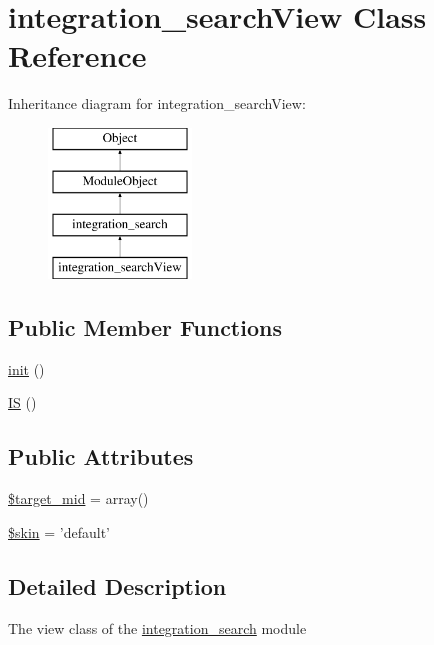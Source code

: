 \hypertarget{classintegration__searchView}{\section{integration\-\_\-search\-View Class Reference}
\label{classintegration__searchView}
}
Inheritance diagram for integration\-\_\-search\-View\-:\begin{figure}[H]
\begin{center}
\leavevmode
\includegraphics[height=4.000000cm]{classintegration__searchView}
\end{center}
\end{figure}
\subsection*{Public Member Functions}
\begin{DoxyCompactItemize}
\item 
\hyperlink{classintegration__searchView_aeed621ea43574fc7b4c5d650d1d698b6}{init} ()
\item 
\hyperlink{classintegration__searchView_a271296176ae955cb88c55c5eac511a23}{I\-S} ()
\end{DoxyCompactItemize}
\subsection*{Public Attributes}
\begin{DoxyCompactItemize}
\item 
\hyperlink{classintegration__searchView_a17efafd7259acddb90e2c181bcfeaa38}{\$target\-\_\-mid} = array()
\item 
\hyperlink{classintegration__searchView_a4281fc0752039ec4025ddaca5771f074}{\$skin} = 'default'
\end{DoxyCompactItemize}


\subsection{Detailed Description}
The view class of the \hyperlink{classintegration__search}{integration\-\_\-search} module

